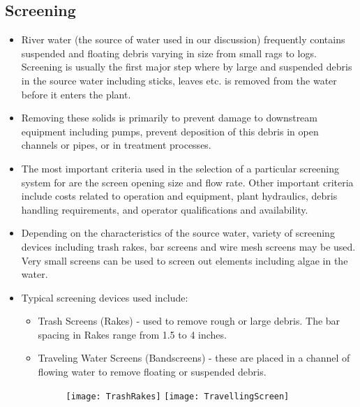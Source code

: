 \begin{itemize}
\subsection{Screening}
\begin{itemize}
\item River water (the source of water used in our discussion) frequently contains suspended and floating debris varying in size from small rags to logs. Screening is usually the first major step where by large and suspended debris in the source water including sticks, leaves etc. is removed from the water before it enters the plant. 
\item Removing these solids is primarily to prevent damage to downstream equipment including pumps, prevent deposition of this debris in open channels or pipes, or in treatment processes.
\item The most important criteria used in the selection of a particular screening system for are the screen opening size and flow rate. Other important criteria include costs related to operation and equipment, plant hydraulics, debris handling requirements, and operator qualifications and availability. 
\item Depending on the characteristics of the source water, variety of screening devices including trash rakes, bar screens and wire mesh screens may be used. Very small screens can be used to screen out elements including algae in the water.
\item Typical screening devices used include:
\begin{itemize}
\item Trash Screens (Rakes) - used to remove rough or large debris.  The bar spacing in Rakes range from 1.5 to 4 inches.
\item Traveling Water Screens (Bandscreens) - these are placed in a channel of flowing water to remove floating or suspended debris.
\begin{figure}[h]
\begin{center}
\texttt{[image: TrashRakes]}
\texttt{[image: TravellingScreen]}
\end{center}
\end{figure}
\end{itemize}




\end{itemize}
\end{itemize}

